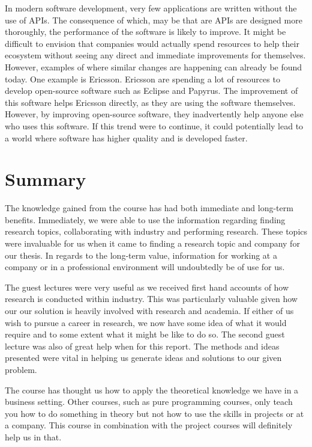 \documentclass{article}
\begin{document}
In modern software development, very few applications are written without the use of APIs. The consequence of which, may be that are APIs are designed more thoroughly, the performance of the software is likely to improve. It might be difficult to envision that companies would actually spend resources to help their ecosystem without seeing any direct and immediate improvements for themselves. However, examples of where similar changes are happening can already be found today. One example is Ericsson. Ericsson are spending a lot of resources to develop open-source software such as Eclipse and Papyrus. The improvement of this software helps Ericsson directly, as they are using the software themselves. However, by improving open-source software, they inadvertently help anyone else who uses this software. If this trend were to continue, it could potentially lead to a world where software has higher quality and is developed faster. 

\section{Summary}
The knowledge gained from the course has had both immediate and long-term benefits. Immediately, we were able to use the information regarding finding research topics, collaborating with industry and performing research. These topics were invaluable for us when it came to finding a research topic and company for our thesis. In regards to the long-term value, information for working at a company or in a professional environment will undoubtedly be of use for us. 

The guest lectures were very useful as we received first hand accounts of how research is conducted within industry. This was particularly valuable given how our our solution is heavily involved with research and academia. If either of us wish to pursue a career in research, we now have some idea of what it would require and to some extent what it might be like to do so. The second guest lecture was also of great help when for this report. The methods and ideas presented were vital in helping us generate ideas and solutions to our given problem.

The course has thought us how to apply the theoretical knowledge we have in a business setting. Other courses, such as pure programming courses, only teach you how to do something in theory but not how to use the skills in projects or at a company. This course in combination with the project courses will definitely help us in that. 
\end{document}
